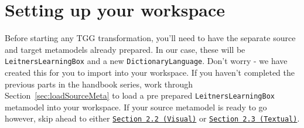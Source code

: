\newpage
\section{Setting up your workspace}
\genHeader

Before starting any TGG transformation, you'll need to have the separate source and target metamodels already prepared. In our case, these will be
\texttt{LeitnersLearningBox} and a new \texttt{DictionaryLanguage}. Don't worry - we have created this for you to import into your workspace. If you haven't
completed the previous parts in the handbook series, work through Section~\ref{sec:loadSourceMeta} to load a pre prepared \texttt{LeitnersLearningBox}
metamodel into your workspace. If your source metamodel is ready to go however, skip ahead to  either \texttt{\hyperlink{sec:multiEAP}{Section 2.2 (Visual)}}
or \texttt{\hyperlink{sec:multiMOSL}{Section 2.3 (Textual)}}.



